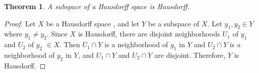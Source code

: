 \documentclass[12pt]{article}
\newtheorem{thm}{Theorem}
\begin{document}
\begin{thm}A subspace of a Hausdorff space is Hausdorff.
\end{thm}

\begin{proof}
Let $ X$ be a Hausdorff space , and let $ Y$ be a subspace of $ X$. Let $y_1,y_2 \in Y$ where $y_1\neq y_2$.
Since $X$ is Hausdorff, there are disjoint neighborhoods $U_1$ of $y_1$ and $U_2$ of $y_2$ $\in X$. Then
$U_1 \cap Y$ is a neighborhood of $y_1$ in $Y$ and $U_2 \cap Y$ is a neighborhood of $y_2$ in $Y$, and $U_1 \cap Y$ and $U_2 \cap Y$ are disjoint. 
Therefore, $Y$ is Hausdorff.
\end{proof}
\end{document}
